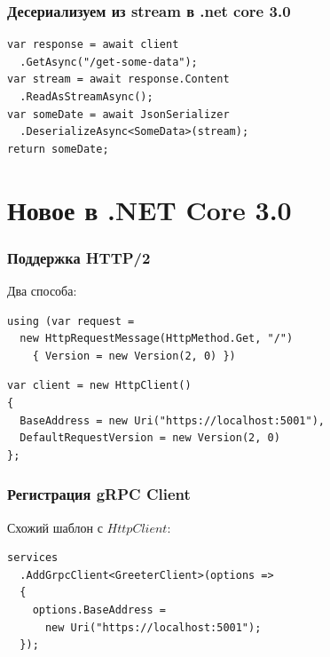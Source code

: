 \documentclass{beamer}
\begin{document}
\begin{frame}[fragile]
\frametitle{Десериализуем из stream в .net core 3.0}
\begin{lstlisting}
var response = await client
  .GetAsync("/get-some-data");
var stream = await response.Content
  .ReadAsStreamAsync();
var someDate = await JsonSerializer
  .DeserializeAsync<SomeData>(stream);
return someDate;
\end{lstlisting}
\end{frame}

\section{Новое в .NET Core 3.0}
\begin{frame}[fragile]
\frametitle{Поддержка HTTP/2}
Два способа:
\newline
\begin{lstlisting}
using (var request = 
  new HttpRequestMessage(HttpMethod.Get, "/") 
    { Version = new Version(2, 0) })
\end{lstlisting}
\begin{lstlisting}
var client = new HttpClient()
{
  BaseAddress = new Uri("https://localhost:5001"),
  DefaultRequestVersion = new Version(2, 0)
};
\end{lstlisting}
\end{frame}

\begin{frame}[fragile]
\frametitle{Регистрация gRPC Client}
Схожий шаблон с $HttpClient$:
\newline
\begin{lstlisting}
services
  .AddGrpcClient<GreeterClient>(options =>
  {
    options.BaseAddress = 
      new Uri("https://localhost:5001");
  });
\end{lstlisting}
\end{frame}
\end{document}
